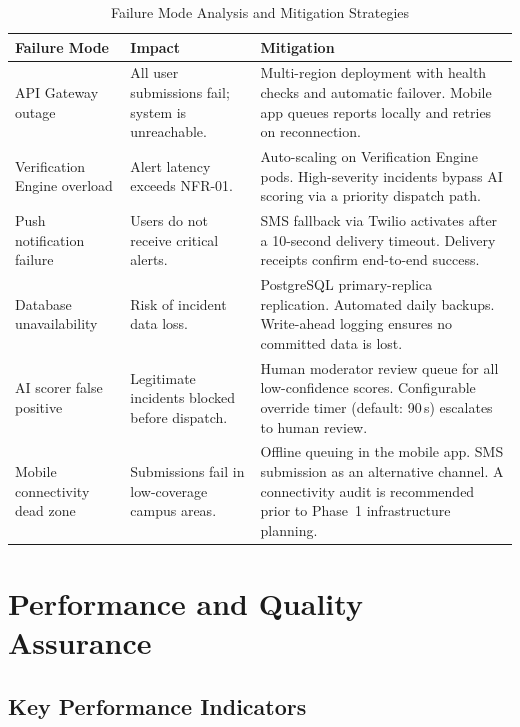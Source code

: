 \documentclass[10pt,twocolumn]{article}
\begin{document}
\begin{table}[ht]
\caption{Failure Mode Analysis and Mitigation Strategies}
\label{tab:failures}
\renewcommand{\arraystretch}{1.2}
\centering
\begin{tabular}{L{2.8cm} L{4.0cm} L{9.2cm}}
\toprule
\textbf{Failure Mode} & \textbf{Impact} & \textbf{Mitigation} \\
\midrule
API Gateway outage
& All user submissions fail; system is unreachable.
& Multi-region deployment with health checks and automatic failover.
  Mobile app queues reports locally and retries on reconnection. \\
\addlinespace
Verification Engine overload
& Alert latency exceeds NFR-01.
& Auto-scaling on Verification Engine pods. High-severity incidents
  bypass AI scoring via a priority dispatch path. \\
\addlinespace
Push notification failure
& Users do not receive critical alerts.
& SMS fallback via Twilio activates after a 10-second delivery
  timeout. Delivery receipts confirm end-to-end success. \\
\addlinespace
Database unavailability
& Risk of incident data loss.
& PostgreSQL primary-replica replication. Automated daily backups.
  Write-ahead logging ensures no committed data is lost. \\
\addlinespace
AI scorer false positive
& Legitimate incidents blocked before dispatch.
& Human moderator review queue for all low-confidence scores.
  Configurable override timer (default: 90\,s) escalates to human
  review. \\
\addlinespace
Mobile connectivity dead zone
& Submissions fail in low-coverage campus areas.
& Offline queuing in the mobile app. SMS submission as an
  alternative channel. A connectivity audit is recommended prior to
  Phase~1 infrastructure planning. \\
\bottomrule
\end{tabular}
\end{table}

\section{Performance and Quality Assurance}

\subsection{Key Performance Indicators}
\end{document}

